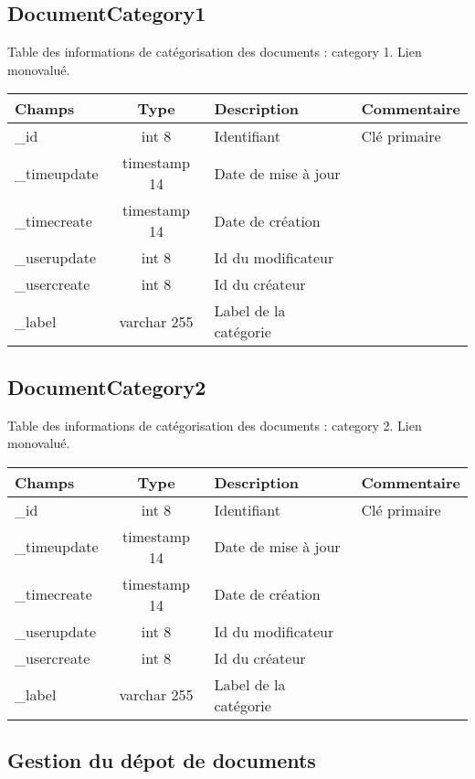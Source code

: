 \subsection{DocumentCategory1}
Table des informations de catégorisation des documents :  category 1.
Lien monovalué.\\

\begin{tabular}{|p{3cm}|c|p{5.4cm}|p{2.6cm}|}
\hline
\textbf{Champs} & \textbf{Type} & \textbf{Description} & \textbf{Commentaire} \\
\hline
\_id & int 8 & Identifiant & Clé primaire \\
\hline
\_timeupdate & timestamp 14 & Date de mise à jour & \\
\hline
\_timecreate & timestamp 14 & Date de création & \\
\hline
\_userupdate & int 8 & Id du modificateur & \\
\hline
\_usercreate & int 8 & Id du créateur & \\
\hline
\_label & varchar 255 & Label de la catégorie & \\
\hline
\end{tabular}


\subsection{DocumentCategory2}
Table des informations de catégorisation des documents :  category 2.
Lien monovalué.\\

\begin{tabular}{|p{3cm}|c|p{5.4cm}|p{2.6cm}|}
\hline
\textbf{Champs} & \textbf{Type} & \textbf{Description} & \textbf{Commentaire} \\
\hline
\_id & int 8 & Identifiant & Clé primaire \\
\hline
\_timeupdate & timestamp 14 & Date de mise à jour & \\
\hline
\_timecreate & timestamp 14 & Date de création & \\
\hline
\_userupdate & int 8 & Id du modificateur & \\
\hline
\_usercreate & int 8 & Id du créateur & \\
\hline
\_label & varchar 255 & Label de la catégorie & \\
\hline
\end{tabular}


\subsection{Gestion du dépot de documents}


